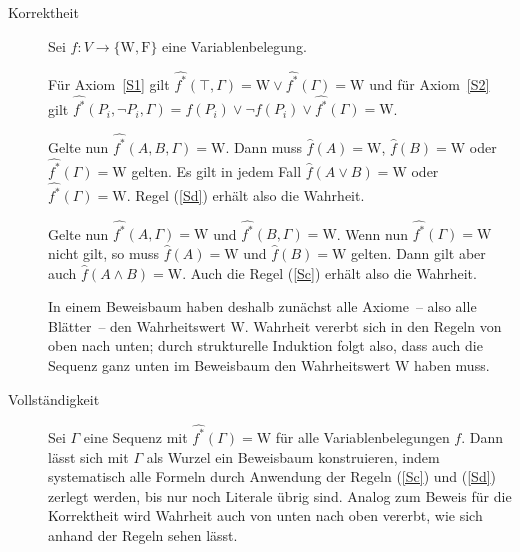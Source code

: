 \begin{beweis}
  \begin{description}
  \item[Korrektheit] Sei $f : V\rightarrow \{ \mathrm{W}, \mathrm{F}\}$ eine
    Variablenbelegung.  

    Für Axiom~\ref{S1} gilt 
    $\widehat{\mbox{$f$}^*}(\top,\Gamma)=\mathrm{W}\vee\widehat{\mbox{$f$}^*}(\Gamma)=\mathrm{W}$ und für Axiom~\ref{S2} gilt $\widehat{\mbox{$f$}^*}(P_i,\neg P_i,\Gamma)=f(P_i)\vee\neg f(P_i)\vee\widehat{\mbox{$f$}^*}(\Gamma)=\mathrm{W}$.
    
    Gelte nun $\widehat{\mbox{$f$}^*}(A, B, \Gamma)=\mathrm{W}$.  Dann muss ${\hat{f}}(A)=\mathrm{W}$,
    ${\hat{f}}(B)=\mathrm{W}$ oder
    $\widehat{\mbox{$f$}^*}(\Gamma)=\mathrm{W}$ gelten.
    Es gilt in jedem Fall
    ${\hat{f}}(A\vee B)=\mathrm{W}$ oder $\widehat{\mbox{$f$}^*}(\Gamma)=\mathrm{W}$.
    Regel (\ref{Sd}) erhält also die Wahrheit.
    
    Gelte nun $\widehat{\mbox{$f$}^*}(A, \Gamma)=\mathrm{W}$ und $\widehat{\mbox{$f$}^*}(B, \Gamma)=\mathrm{W}$.
    Wenn nun $\widehat{\mbox{$f$}^*}(\Gamma)=\mathrm{W}$ nicht gilt, so muss ${\hat{f}}(A)=\mathrm{W}$ und
    ${\hat{f}}(B)=\mathrm{W}$ gelten.  Dann gilt aber auch ${\hat{f}}(A\wedge B)=\mathrm{W}$.
    Auch die Regel (\ref{Sc}) erhält also die Wahrheit.
    
    In einem Beweisbaum haben deshalb zunächst alle Axiome~-- also alle
    Blätter~-- den Wahrheitswert $\mathrm{W}$.  Wahrheit vererbt sich in den Regeln
    von oben nach unten; durch strukturelle Induktion folgt also, dass auch
    die Sequenz ganz unten im Beweisbaum den Wahrheitswert $\mathrm{W}$ haben muss.
  \item[Vollständigkeit] Sei $\Gamma$ eine Sequenz mit
    $\widehat{\mbox{$f$}^*}(\Gamma)=\mathrm{W}$ für alle Variablenbelegungen $f$.
    Dann lässt sich mit $\Gamma$ als Wurzel ein 
    Beweisbaum konstruieren, indem systematisch alle Formeln durch Anwendung
    der Regeln (\ref{Sc}) und (\ref{Sd}) zerlegt werden, bis nur noch Literale
    übrig sind.
    Analog zum Beweis für die Korrektheit wird Wahrheit
    auch von unten nach oben vererbt, wie sich anhand der
    Regeln sehen lässt.
    

\end{description}
\end{beweis}
